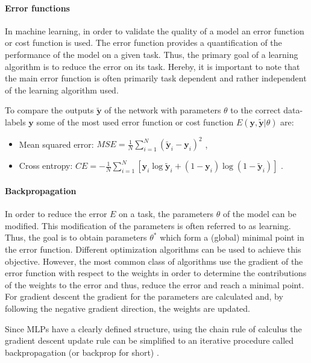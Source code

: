 \paragraph{Error functions} \label{c:mlperr}

In machine learning, in order to validate the quality of a model an error function or cost function is used.
The error function provides a quantification of the performance of the model on a given task.
Thus, the primary goal of a learning algorithm is to reduce the error on its task.
Hereby, it is important to note that the main error function is often primarily task dependent and rather independent of the learning algorithm used.  

To compare the outputs $\tilde{\textbf{y}}$ of the network with parameters $\theta$ to the correct data-labels $\textbf{y}$ some of the most used error function or cost function $E(\textbf{y},\tilde{\textbf{y}} | \theta)$ are:

\begin{itemize}
	\item Mean squared error: $MSE = \frac{1}{N} \sum_{i=1}^N (\tilde{\textbf{y}}_i - \textbf{y}_i)^2 $ ,
	\item Cross entropy: $CE = - \frac{1}{N} \sum_{i=1}^N [ \textbf{y}_i \log \tilde{\textbf{y}}_i + (1 - \textbf{y}_i) \log (1 - \tilde{\textbf{y}}_i)]$ .
\end{itemize}

\paragraph{Backpropagation} \label{c:backprop}

In order to reduce the error $E$ on a task, the parameters $\theta$ of the model can be modified.
This modification of the parameters is often referred to as learning.
Thus, the goal is to obtain parameters $\theta^*$ which form a (global) minimal point in the error function. 
Different optimization algorithms can be used to achieve this objective.
However, the most common class of algorithms use the gradient of the error function with respect to the weights in order to determine the contributions of the weights to the error and thus, reduce the error and reach a minimal point.
For gradient descent the gradient for the parameters are calculated and, by following the negative gradient direction, the weights are updated.

Since MLPs have a clearly defined structure, using the chain rule of calculus the gradient descent update rule can be simplified to an iterative procedure called backpropagation (or backprop for short)  \cite{Goodfellow-et-al-2016-Book, rumelhart1985learning}.

